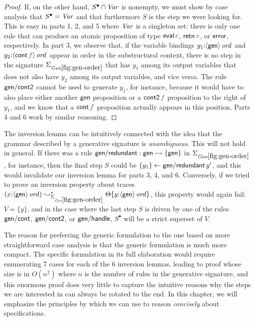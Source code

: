 \begin{proof}
  If, on the other hand, $S^{\bullet} \cap {\it Var}$ is nonempty, we
  must show by case analysis that $S^{\bullet} = {\it Var}$ and that
  furthermore $S$ is the step we were looking for. This is easy in
  parts 1, 2, and 5 where ${\it Var}$ is a singleton set: there is
  only one rule that can produce an atomic proposition of type ${\sf
    eval}\,\lf{e}$, ${\sf retn}\,\lf{v}$, or ${\sf error}$,
  respectively.  In part 3, we observe that, if the variable bindings
  $y_1{:}{\langle {{\sf gen}} \rangle}\,{{\it ord}}$ and $y_2{:}\istrue{\susp{{\sf
        cont}\,\lf{f}}}$ appear in order in the substructural context,
  there is no step in the signature $\siggenorder$ that has $y_1$
  among its output variables that does not also have $y_2$ among its
  output variables, and vice versa. The rule ${\sf gen/cont2}$ cannot
  be used to generate $y_1$, for instance, because it would have to
  also place either another ${\sf gen}$ proposition or a ${\sf
    cont2}\,{\lf f}$ proposition to the right of $y_1$, and we know
  that a ${\sf cont}\,{\lf f}$ proposition actually appears in this
  position. Parts 4 and 6 work by similar reasoning.
\end{proof}

The inversion lemma can be intuitively connected with the
idea that the grammar described by a generative signature is {\it
  unambiguous}. This will not hold in general. If there was
a rule ${\sf gen/redundant} : {\sf gen} \rightarrowtail \{ {\sf gen} \}$ in
$\Sigma_{\it Gen\ref{fig:gen-order}}$, for instance, then the final
step $S$ could be
$\{{y_1}\} \leftarrow {{\sf gen/redundant}\,y'}$, and this would invalidate our
inversion lemma
for parts 3, 4, and 6. 
Conversely, if we tried to prove an inversion
property about traces $(x{:}\istrue{\susp{\sf gen}})
\leadsto^*_{\siggenorder} \tackon{\Theta}{y{:}\istrue{\susp{{\sf
        gen}}}}$, this property would again fail: $V = \{ y
\}$, and in the case where the last step $S$ is driven by one of the
rules ${\sf gen/cont}$, ${\sf gen/cont2}$, or ${\sf gen/handle}$,
$S^{\bullet}$ will be a strict superset of $V$.

The reason for preferring the generic formulation to the one based on
more straightforward case analysis is that the generic formulation is
much more compact. The specific formulation in its full elaboration
would require enumerating 7 cases for each of the 6 inversion lemmas,
leading to proof whose size is in $O(n^2)$ where $n$ is the number of
rules in the generative signature, and this enormous proof does very
little to capture the intuitive reasons why the steps we are
interested in can always be rotated to the end. In this chapter, we
will emphasize the principles by which we can use to reason {\it
  concisely} about specifications.

